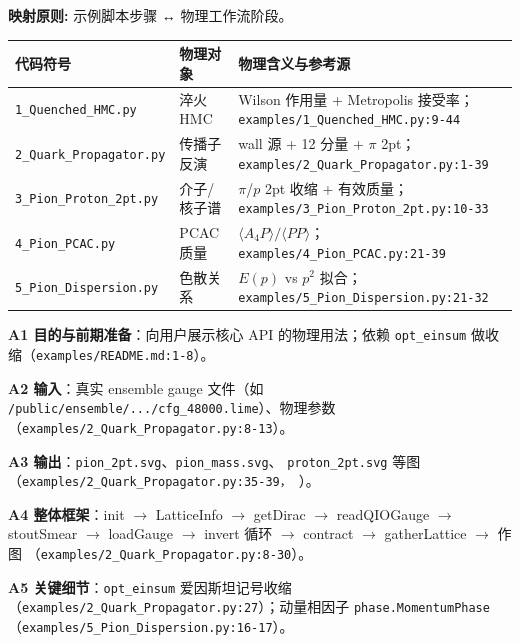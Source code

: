 \documentclass[UTF8]{ctexart}
\begin{document}
\begin{mapbox}
\textbf{映射原则:} 示例脚本步骤 ↔ 物理工作流阶段。
\end{mapbox}
\begin{xltabular}{\textwidth}{llX}
\toprule
\textcolor{map}{代码符号} & 物理对象 & 物理含义与参考源 \\
\midrule
\endhead
\texttt{1\_Quenched\_HMC.py} & 淬火 HMC &
Wilson 作用量 + Metropolis 接受率；
\texttt{\nolinkurl{examples/1_Quenched_HMC.py:9-44}} \\
\texttt{2\_Quark\_Propagator.py} & 传播子反演 &
wall 源 + 12 分量 + $\pi$ 2pt；
\texttt{\nolinkurl{examples/2_Quark_Propagator.py:1-39}} \\
\texttt{3\_Pion\_Proton\_2pt.py} & 介子/核子谱 &
$\pi$/$p$ 2pt 收缩 + 有效质量；
\texttt{\nolinkurl{examples/3_Pion_Proton_2pt.py:10-33}} \\
\texttt{4\_Pion\_PCAC.py} & PCAC 质量 &
$\langle A_4 P\rangle/\langle PP\rangle$；
\texttt{\nolinkurl{examples/4_Pion_PCAC.py:21-39}} \\
\texttt{5\_Pion\_Dispersion.py} & 色散关系 &
$E(p)$ vs $p^2$ 拟合；
\texttt{\nolinkurl{examples/5_Pion_Dispersion.py:21-32}} \\
\bottomrule
\end{xltabular}

\textbf{A1 目的与前期准备}：向用户展示核心 API 的物理用法；依赖
\texttt{opt\_einsum} 做收缩（\texttt{\nolinkurl{examples/README.md:1-8}}）。

\textbf{A2 输入}：真实 ensemble gauge 文件（如
\texttt{/public/ensemble/.../cfg\_48000.lime}）、物理参数
（\texttt{\nolinkurl{examples/2_Quark_Propagator.py:8-13}}）。

\textbf{A3 输出}：\texttt{pion\_2pt.svg}、\texttt{pion\_mass.svg}、
\texttt{proton\_2pt.svg} 等图（\texttt{\nolinkurl{examples/2_Quark_Propagator.py:35-39}，
}）。

\textbf{A4 整体框架}：init  $\rightarrow$  LatticeInfo  $\rightarrow$  getDirac  $\rightarrow$  readQIOGauge  $\rightarrow$  stoutSmear
 $\rightarrow$  loadGauge  $\rightarrow$  invert 循环  $\rightarrow$  contract  $\rightarrow$  gatherLattice  $\rightarrow$  作图
（\texttt{\nolinkurl{examples/2_Quark_Propagator.py:8-30}}）。

\textbf{A5 关键细节}：\texttt{opt\_einsum} 爱因斯坦记号收缩
（\texttt{\nolinkurl{examples/2_Quark_Propagator.py:27}}）；动量相因子
\texttt{phase.MomentumPhase}（\texttt{\nolinkurl{examples/5_Pion_Dispersion.py:16-17}}）。
\end{document}
